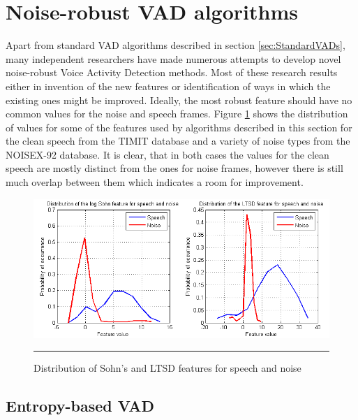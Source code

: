 
\section{Noise-robust VAD algorithms}
\label{sec:RobustVADs}

Apart from standard VAD algorithms described in section \ref{sec:StandardVADs}, many independent researchers have made numerous attempts to develop novel noise-robust Voice Activity Detection methods. Most of these research results either in invention of the new features or identification of ways in which the existing ones might be improved. Ideally, the most robust feature should have no common values for the noise and speech frames. Figure \ref{fig:featureDist} shows the distribution of values for some of the features used by algorithms described in this section for the clean speech from the TIMIT \cite{TIMIT} database and a variety of noise types from the NOISEX-92 \cite{NOISEX} database. It is clear, that in both cases the values for the clean speech are mostly distinct from the ones for noise frames, however there is still much overlap between them which indicates a room for improvement.

\begin{figure}[htbp]
	\centering
		\includegraphics[width=0.9\columnwidth]{Figures/Chapter2/featureDist.png}
		\rule{37em}{0.5pt}
	\caption[Distribution of Sohn's and LTSD features for speech and noise]{Distribution of Sohn's \cite{SohnInitial} and LTSD \cite{LTSD} features for speech and noise}
	\label{fig:featureDist}
\end{figure}

\subsection{Entropy-based VAD}

